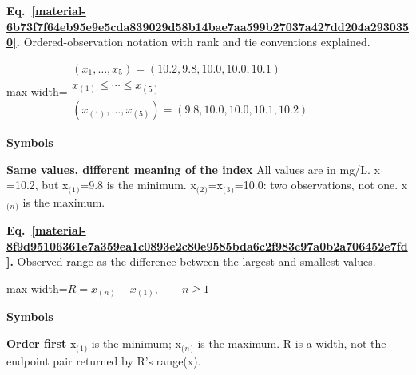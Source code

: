 \documentclass[11pt,a4paper]{article}
\begin{document}
\par\medskip
\noindent\begin{minipage}{\linewidth}
\label{material-6b73f7f64eb95e9e5cda839029d58b14bae7aa599b27037a427dd204a2930350}
\noindent\textbf{Eq.~\ref*{material-6b73f7f64eb95e9e5cda839029d58b14bae7aa599b27037a427dd204a2930350}.} Ordered-observation notation with rank and tie conventions explained.\par\nopagebreak
\begin{center}\begin{adjustbox}{max width=\linewidth}$\displaystyle \begin{gathered}(x_1,\ldots,x_5)=(10.2,9.8,10.0,10.0,10.1)\\x_{(1)}\le\cdots\le x_{(5)}\\(x_{(1)},\ldots,x_{(5)})=(9.8,10.0,10.0,10.1,10.2)\end{gathered}$\end{adjustbox}\end{center}

\par\noindent\textbf{Symbols}

\par\noindent\textbf{Same values, different meaning of the index} All values are in mg/L. x\ensuremath{{}_1}=10.2, but x\ensuremath{{}_{(}}\ensuremath{{}_1}\ensuremath{{}_{)}}=9.8 is the minimum. x\ensuremath{{}_{(}}\ensuremath{{}_2}\ensuremath{{}_{)}}=x\ensuremath{{}_{(}}\ensuremath{{}_3}\ensuremath{{}_{)}}=10.0: two observations, not one. x\ensuremath{{}_{(}}\ensuremath{{}_n}\ensuremath{{}_{)}} is the maximum.

\end{minipage}\par
\medskip

\par\medskip
\noindent\begin{minipage}{\linewidth}
\label{material-8f9d95106361e7a359ea1c0893e2c80e9585bda6c2f983c97a0b2a706452e7fd}
\noindent\textbf{Eq.~\ref*{material-8f9d95106361e7a359ea1c0893e2c80e9585bda6c2f983c97a0b2a706452e7fd}.} Observed range as the difference between the largest and smallest values.\par\nopagebreak
\begin{center}\begin{adjustbox}{max width=\linewidth}$\displaystyle R=x_{(n)}-x_{(1)},\qquad n\ge1$\end{adjustbox}\end{center}

\par\noindent\textbf{Symbols}

\par\noindent\textbf{Order first} x\ensuremath{{}_{(}}\ensuremath{{}_1}\ensuremath{{}_{)}} is the minimum; x\ensuremath{{}_{(}}\ensuremath{{}_n}\ensuremath{{}_{)}} is the maximum. R is a width, not the endpoint pair returned by R's range(x).

\end{minipage}\par
\medskip
\end{document}
